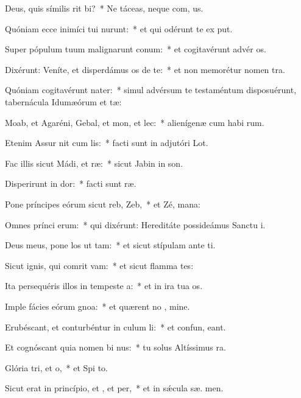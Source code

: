 \item Deus, quis símilis rit bi?~* Ne táceas, neque com, us.
\item Quóniam ecce inimíci tui nurunt:~* et qui odérunt te ex put.
\item Super pópulum tuum malignarunt conum:~* et cogitavérunt advér  os.
\item Dixérunt: Veníte, et disperdámus os de te:~* et non memorétur nomen  tra.
\item Quóniam cogitavérunt nater:~* simul advérsum te testaméntum disposuérunt, tabernácula Idumæórum et tæ:
\item Moab, et Agaréni, Gebal, et mon, et lec:~* alienígenæ cum habi rum.
\item Etenim Assur nit cum lis:~* facti sunt in adjutóri  Lot.
\item Fac illis sicut Mádi, et ræ:~* sicut Jabin in  son.
\item Disperirunt in dor:~* facti sunt   ræ.
\item Pone príncipes eórum sicut reb,  Zeb,~* et Zé,  mana:
\item Omnes prínci erum:~* qui dixérunt: Hereditáte possideámus Sanctu i.
\item Deus meus, pone los ut tam:~* et sicut stípulam ante  ti.
\item Sicut ignis, qui comrit vam:~* et sicut flamma  tes:
\item Ita persequéris illos in tempeste a:~* et in ira tua  os.
\item Imple fácies eórum gnoa:~* et quærent no , mine.
\item Erubéscant, et conturbéntur in culum li:~* et confun,  eant.
\item Et cognóscant quia nomen bi nus:~* tu solus Altíssimus   ra.
\item Glória tri, et o,~* et Spi to.
\item Sicut erat in princípio, et , et per,~* et in sǽcula sæ. men.
